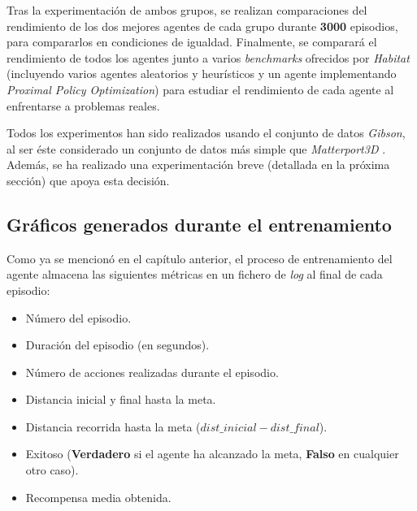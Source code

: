 Tras la experimentación de ambos grupos, se realizan comparaciones del rendimiento de los dos mejores agentes de cada grupo durante \textbf{3000} episodios, para compararlos en condiciones de igualdad. Finalmente, se comparará el rendimiento de todos los agentes junto a varios \textit{benchmarks} ofrecidos por \textit{Habitat} (incluyendo varios agentes aleatorios y heurísticos y un agente implementando \textit{Proximal Policy Optimization}) para estudiar el rendimiento de cada agente al enfrentarse a problemas reales.

Todos los experimentos han sido realizados usando el conjunto de datos \textit{Gibson}, al ser éste considerado un conjunto de datos más simple que \textit{Matterport3D} \cite{habitat19iccv}. Además, se ha realizado una experimentación breve (detallada en la próxima sección) que apoya esta decisión.

\subsection{Gráficos generados durante el entrenamiento}

Como ya se mencionó en el capítulo anterior, el proceso de entrenamiento del agente almacena las siguientes métricas en un fichero de \textit{log} al final de cada episodio:
\begin{itemize}
	\item Número del episodio.
	\item Duración del episodio (en segundos).
	\item Número de acciones realizadas durante el episodio.
	\item Distancia inicial y final hasta la meta.
	\item Distancia recorrida hasta la meta ($dist\_inicial - dist\_final$).
	\item Exitoso (\textbf{Verdadero} si el agente ha alcanzado la meta, \textbf{Falso} en cualquier otro caso).
	\item Recompensa media obtenida.
\end{itemize}

